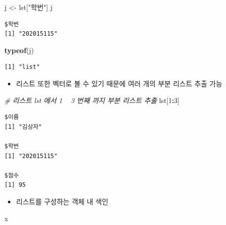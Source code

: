\documentclass[
  11pt,
]{krantz}
\newenvironment{Shaded}{\begin{snugshade}}{\end{snugshade}}
\newcommand{\CommentTok}[1]{\textcolor[rgb]{0.37,0.37,0.37}{\textit{#1}}}
\newcommand{\DecValTok}[1]{\textcolor[rgb]{0.06,0.06,0.06}{#1}}
\newcommand{\KeywordTok}[1]{\textcolor[rgb]{0.27,0.27,0.27}{\textbf{#1}}}
\newcommand{\NormalTok}[1]{#1}
\newcommand{\OperatorTok}[1]{\textcolor[rgb]{0.43,0.43,0.43}{\textbf{#1}}}
\newcommand{\StringTok}[1]{\textcolor[rgb]{0.5,0.5,0.5}{#1}}
\providecommand{\tightlist}{%
  \setlength{\itemsep}{0pt}\setlength{\parskip}{0pt}}
\begin{document}
\begin{Shaded}
\begin{Highlighting}[]
\NormalTok{j <-}\StringTok{ }\NormalTok{lst[}\StringTok{"학번"}\NormalTok{]}
\NormalTok{j}
\end{Highlighting}
\end{Shaded}

\begin{verbatim}
$학번
[1] "202015115"
\end{verbatim}

\begin{Shaded}
\begin{Highlighting}[]
\KeywordTok{typeof}\NormalTok{(j)}
\end{Highlighting}
\end{Shaded}

\begin{verbatim}
[1] "list"
\end{verbatim}

\normalsize

\begin{itemize}
\tightlist
\item
  리스트 또한 벡터로 볼 수 있기 때문에 여러 개의 부분 리스트 추출 가능
\end{itemize}

\footnotesize

\begin{Shaded}
\begin{Highlighting}[]
\CommentTok{# 리스트 lst 에서 1 ~ 3 번째 까지 부분 리스트 추출}
\NormalTok{lst[}\DecValTok{1}\OperatorTok{:}\DecValTok{3}\NormalTok{]}
\end{Highlighting}
\end{Shaded}

\begin{verbatim}
$이름
[1] "김상자"

$학번
[1] "202015115"

$점수
[1] 95
\end{verbatim}

\normalsize

\begin{itemize}
\tightlist
\item
  리스트를 구성하는 객체 내 색인
\end{itemize}

\footnotesize

\begin{Shaded}
\begin{Highlighting}[]
\NormalTok{x}
\end{Highlighting}
\end{Shaded}
\end{document}
